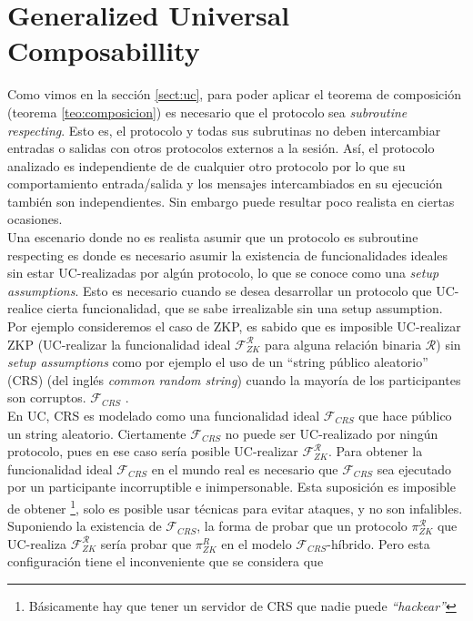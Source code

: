 \section{Generalized Universal Composabillity}
Como vimos en la sección \ref{sect:uc}, para poder aplicar el teorema de composición (teorema
\ref{teo:composicion}) es necesario que el protocolo sea \textit{subroutine respecting}.
Esto es, el protocolo y todas sus subrutinas no deben intercambiar entradas o salidas con otros
protocolos externos a la sesión. Así, el protocolo analizado es independiente de de cualquier
otro protocolo por lo que su comportamiento entrada/salida y los mensajes intercambiados en su
ejecución también son independientes. Sin embargo puede resultar poco realista en ciertas ocasiones.\\
Una escenario donde no es realista asumir que un protocolo es subroutine respecting es donde
es necesario asumir la existencia de funcionalidades ideales sin estar UC-realizadas por algún
protocolo, lo que se conoce como una \textit{setup assumptions}. Esto es necesario cuando se desea
desarrollar un protocolo que UC-realice cierta funcionalidad, que se sabe irrealizable sin una setup
assumption. Por ejemplo consideremos el caso de ZKP, es sabido que es imposible UC-realizar
ZKP (UC-realizar la funcionalidad ideal $\mathcal{F}_{ZK}^\mathcal{R}$ para alguna relación binaria
$\mathcal{R}$) sin \textit{setup assumptions} como por ejemplo el uso de un ``string público
aleatorio'' (CRS) (del inglés \textit{common random string}) cuando la mayoría de los participantes
son corruptos. $\mathcal{F}_{CRS}$ \cite{CanKusLin06}.\\
En UC, CRS es modelado como una funcionalidad ideal $\mathcal{F}_{CRS}$ que hace público un string
aleatorio. Ciertamente $\mathcal{F}_{CRS}$ no puede ser UC-realizado por ningún protocolo, pues
en ese caso sería posible UC-realizar $\mathcal{F}_{ZK}^\mathcal{R}$. Para obtener la funcionalidad ideal
$\mathcal{F}_{CRS}$ en el mundo real es necesario que $\mathcal{F}_{CRS}$ sea ejecutado por un participante
incorruptible e inimpersonable. Esta suposición es imposible de obtener
\footnote{Básicamente hay que tener un servidor de CRS que nadie puede \textit{``hackear''}},
solo es posible usar técnicas para evitar ataques, y no son infalibles.\\
Suponiendo la existencia de $\mathcal{F}_{CRS}$, la forma de probar que un protocolo $\pi_{ZK}^\mathcal{R}$
que UC-realiza $\mathcal{F}_{ZK}^\mathcal{R}$ sería probar que $\pi_{ZK}^{R}$ en el modelo
$\mathcal{F}_{CRS}$-híbrido. Pero esta configuración tiene el inconveniente que se considera que
